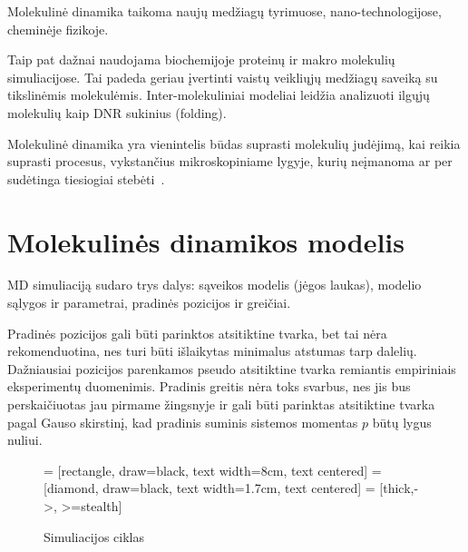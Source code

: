 \documentclass[runningheads]{llncs}
\begin{document}
Molekulinė dinamika taikoma naujų medžiagų tyrimuose, nano-technologijose, cheminėje fizikoje.

Taip pat dažnai naudojama biochemijoje proteinų ir makro molekulių simuliacijose.
Tai padeda geriau įvertinti vaistų veikliųjų medžiagų saveiką su tikslinėmis molekulėmis.
Inter-molekuliniai modeliai leidžia analizuoti ilgųjų molekulių kaip DNR sukinius (folding).

Molekulinė dinamika yra vienintelis būdas suprasti molekulių judėjimą, kai reikia suprasti procesus,
vykstančius mikroskopiniame lygyje, kurių neįmanoma ar per sudėtinga tiesiogiai stebėti~\cite{ref_art}.


\section{Molekulinės dinamikos modelis}

MD simuliaciją sudaro trys dalys: sąveikos modelis (jėgos laukas), modelio sąlygos ir parametrai, pradinės pozicijos ir greičiai.

Pradinės pozicijos gali būti parinktos atsitiktine tvarka, bet tai nėra rekomenduotina, nes turi būti išlaikytas minimalus atstumas tarp dalelių.
Dažniausiai pozicijos parenkamos pseudo atsitiktine tvarka remiantis empiriniais eksperimentų duomenimis.
Pradinis greitis nėra toks svarbus, nes jis bus perskaičiuotas jau pirmame žingsnyje ir gali būti parinktas atsitiktine tvarka pagal Gauso skirstinį,
kad pradinis suminis sistemos momentas \(p\) būtų lygus nuliui.

\begin{figure}
    \centering

    \usetikzlibrary{shapes.geometric, arrows, arrows.meta, positioning, calc}
     = [rectangle, draw=black, text width=8cm, text centered]
     = [diamond, draw=black, text width=1.7cm, text centered]
     = [thick,->, >=stealth]


    \caption[Simuliacijos ciklas] {Simuliacijos ciklas}
    \label{fig:steps}
\end{figure}
\end{document}
